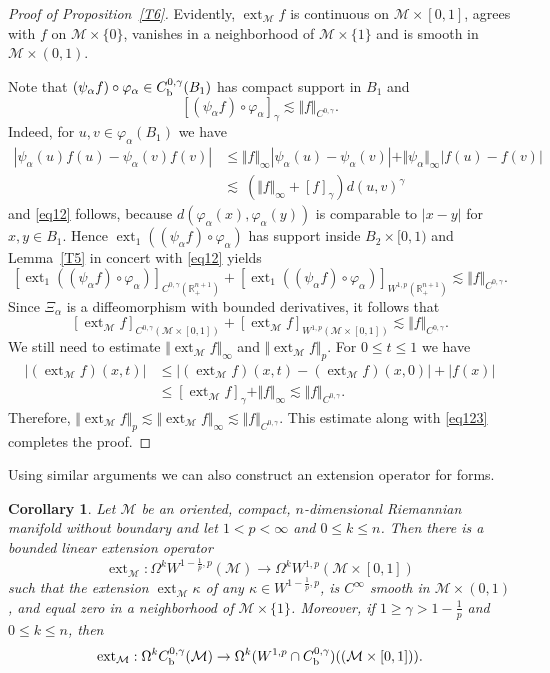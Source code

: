 \documentclass[intlimits,12pt,reqno]{amsart}
\newcommand{\cM}{\mathcal M}
\newcommand{\bbbr}{\mathbb R}
\numberwithin{equation}{section}
\def\ext{\operatorname{ext}}
\newtheorem{corollary}[theorem]{Corollary}
\theoremstyle{definition}
\begin{document}
\begin{proof}[Proof of Proposition~\ref{T6}]
Evidently, $\ext_{\cM} f$ is continuous on $\cM\times [0,1]$, agrees with $f$ on $\cM\times \{ 0 \}$, vanishes in a neighborhood of $\cM\times \{ 1\}$ and is
smooth in $\cM\times (0,1)$.

Note that $(\psi_\alpha f)\circ\varphi_\alpha\in C_{\rm b}^{0,\gamma}(B_1)$ has compact support in $B_1$ and
\begin{equation}
\label{eq12}
[(\psi_\alpha f)\circ\varphi_\alpha]_{\gamma}\lesssim \Vert f\Vert_{C^{0,\gamma}}.
\end{equation}
Indeed, for $u,v\in\varphi_\alpha(B_1)$ we have
\begin{equation*}
\begin{split}
|\psi_\alpha(u)f(u)-\psi_\alpha(v)f(v)|
&\leq
\Vert f\Vert_\infty |\psi_\alpha(u)-\psi_\alpha(v)|+\Vert \psi_\alpha\Vert_\infty|f(u)-f(v)|\\
&\lesssim\
(\Vert f\Vert_\infty+[f]_{\gamma})d(u,v)^\gamma
\end{split}
\end{equation*}
and \eqref{eq12} follows, because $d(\varphi_\alpha(x),\varphi_\alpha(y))$ is comparable to $|x-y|$
for $x,y\in B_1$.
Hence $\ext_1((\psi_\alpha f)\circ\varphi_\alpha)$ has support inside $B_2\times[0,1)$ and Lemma~\ref{T5} in concert with \eqref{eq12} yields
\begin{equation}
\label{eq123}
[\ext_1((\psi_\alpha f)\circ\varphi_\alpha)]_{C^{0,\gamma}(\bbbr^{n+1}_+)}+
[\ext_1((\psi_\alpha f)\circ\varphi_\alpha)]_{W^{1,p}(\bbbr^{n+1}_+)}\lesssim \Vert f\Vert_{C^{0,\gamma}}.
\end{equation}
Since $\Xi_\alpha$  is a diffeomorphism with bounded derivatives, it follows that
$$
[\ext_\cM f]_{C^{0,\gamma}(\cM\times [0,1])} +
[\ext_\cM f]_{W^{1,p}(\cM\times [0,1])}
\lesssim \Vert f\Vert_{C^{0,\gamma}}.
$$
We still need to estimate $\Vert\ext_\cM f\Vert_\infty$ and $\Vert\ext_\cM f\Vert_p$.
For $0\leq t\leq 1$ we have
\[
\begin{split}
|(\ext_\cM f)(x,t)|
&\leq 
|(\ext_\cM f)(x,t)-(\ext_\cM f)(x,0)|+|f(x)|\\
&\leq
[\ext_\cM f]_\gamma+\Vert f\Vert_\infty\lesssim \Vert f\Vert_{C^{0,\gamma}}.
\end{split}
\]
Therefore, $\Vert\ext_\cM f\Vert_p\lesssim\Vert\ext_\cM f\Vert_\infty\lesssim\Vert f\Vert_{C^{0,\gamma}}$.
This estimate along with \eqref{eq123} completes the proof.
\end{proof}
Using similar arguments we can also construct an extension operator for forms.
\begin{corollary}
\label{T7}
Let $\cM$ be an oriented, compact, $n$-dimensional Riemannian manifold without boundary and let $1<p<\infty$ and $0\leq k\leq n$. Then there is a bounded linear extension operator
$$
\ext_{\cM}: \Omega^k W^{1-\frac{1}{p},p}(\cM)\to \Omega^k W^{1,p}(\cM\times [0,1])
$$
such that the extension $\ext_{\cM}\kappa$ of any $\kappa\in W^{1-\frac{1}{p},p}$, is $C^\infty$ smooth in $\cM\times (0,1)$, and equal zero in a neighborhood of $\cM\times\{ 1\}$.
Moreover, if
$1\geq \gamma> 1-\frac{1}{p}$ and $0\leq k\leq n$, then
$$
\ext_{\cM}: \Omega^k C_{\rm b}^{0,\gamma}(\cM)\to \Omega^k (W^{1,p}\cap C_{\rm b}^{0,\gamma})((\cM\times [0,1])).
$$
\end{corollary}
\end{document}
